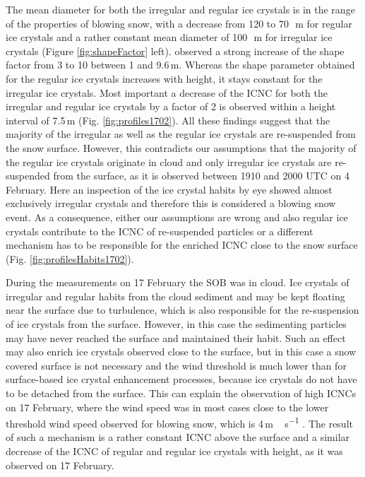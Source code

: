 \documentclass[draft,linenumbers]{agujournal}
\begin{document}
The mean diameter for both the irregular and regular ice crystals is in the range of the properties of blowing snow, with a decrease from 120 to 70\,\si{\mu m} for regular ice crystals and a rather constant  mean diameter of 100\,\si{\mu m}  for irregular ice crystals (Figure \ref{fig:shapeFactor} left). \citet{Nis05} observed a strong increase of the shape factor from 3 to 10 between 1 and 9.6\,\si{m}. Whereas the shape parameter obtained for the regular ice crystals increases with height, it stays constant for the irregular ice crystals. Most important a decrease of the ICNC for both the irregular and regular ice crystals by a factor of 2 is observed within a height interval of 7.5\,\si{m} (Fig. \ref{fig:profiles1702}). All these findings suggest that the majority of the irregular as well as the regular ice crystals are re-suspended from the snow surface. However, this contradicts our assumptions that the majority of the regular ice crystals originate in cloud and only irregular ice crystals are re-suspended from the surface, as it is observed between 1910 and 2000 UTC on 4 February. Here an inspection of the ice crystal habits by eye showed almost exclusively irregular crystals and therefore this is considered a blowing snow event. As a consequence, either our assumptions are wrong and also regular ice crystals contribute to the ICNC of re-suspended particles or a different mechanism has to be responsible for the enriched ICNC close to the snow surface (Fig. \ref{fig:profilesHabits1702}). 

During the measurements on 17 February the SOB was in cloud. Ice crystals of irregular and regular habits from the cloud sediment and may be kept floating near the surface due to turbulence, which is also responsible for the re-suspension of ice crystals from the surface. However, in this case the sedimenting particles may have never reached the surface and maintained their habit. Such an effect may also enrich ice crystals observed close to the surface, but in this case a snow covered surface is not necessary and the wind threshold is much lower than for surface-based ice crystal enhancement processes, because ice crystals do not have to be detached from the surface. This can explain the observation of high ICNCs on 17 February, where the wind speed was in most cases close to the lower threshold wind speed observed for blowing snow, which is 4\,\si{m\,s^{-1}} \citep{Bro88, Li97, Mah03, Der99}. The result of such a mechanism is a rather constant ICNC above the surface and a similar decrease of the ICNC of regular and regular ice crystals with height, as it was observed on 17 February. 
\end{document}
